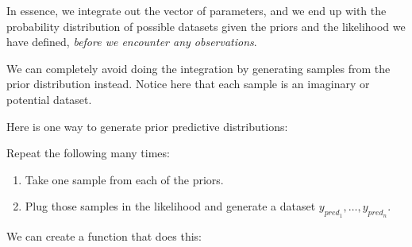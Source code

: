 \documentclass[12pt,]{krantz}
\newenvironment{Shaded}{\begin{snugshade}}{\end{snugshade}}
\newcommand{\CommentTok}[1]{\textcolor[rgb]{0.56,0.35,0.01}{\textit{#1}}}
\newcommand{\ControlFlowTok}[1]{\textcolor[rgb]{0.13,0.29,0.53}{\textbf{#1}}}
\newcommand{\DataTypeTok}[1]{\textcolor[rgb]{0.13,0.29,0.53}{#1}}
\newcommand{\DecValTok}[1]{\textcolor[rgb]{0.00,0.00,0.81}{#1}}
\newcommand{\KeywordTok}[1]{\textcolor[rgb]{0.13,0.29,0.53}{\textbf{#1}}}
\newcommand{\NormalTok}[1]{#1}
\newcommand{\StringTok}[1]{\textcolor[rgb]{0.31,0.60,0.02}{#1}}
\providecommand{\tightlist}{%
  \setlength{\itemsep}{0pt}\setlength{\parskip}{0pt}}
\theoremstyle{definition}
\theoremstyle{definition}
\theoremstyle{definition}
\theoremstyle{remark}
\begin{document}
In essence, we integrate out the vector of parameters, and we end up with the probability distribution of possible datasets given the priors and the likelihood we have defined, \emph{before we encounter any observations}.

We can completely avoid doing the integration by generating samples from the prior distribution instead. Notice here that each sample is an imaginary or potential dataset.

Here is one way to generate prior predictive distributions:

Repeat the following many times:

\begin{enumerate}
\def\labelenumi{\arabic{enumi}.}
\tightlist
\item
  Take one sample from each of the priors.
\item
  Plug those samples in the likelihood and generate a dataset \(y_{pred_1},\ldots,y_{pred_n}\).
\end{enumerate}

We can create a function that does this:

\begin{Shaded}
\end{Shaded}
\end{document}

